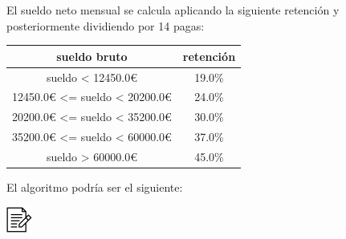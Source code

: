\documentclass[
]{book}
\begin{document}
El sueldo neto mensual se calcula aplicando la siguiente retención y posteriormente dividiendo por 14 pagas:

\begin{longtable}[]{@{}cc@{}}
\toprule
sueldo bruto & retención\tabularnewline
\midrule
\endhead
sueldo \textless{} 12450.0€ & 19.0\%\tabularnewline
12450.0€ \textless= sueldo \textless{} 20200.0€ & 24.0\%\tabularnewline
20200.0€ \textless= sueldo \textless{} 35200.0€ & 30.0\%\tabularnewline
35200.0€ \textless= sueldo \textless{} 60000.0€ & 37.0\%\tabularnewline
sueldo \textgreater{} 60000.0€ & 45.0\%\tabularnewline
\bottomrule
\end{longtable}

El algoritmo podría ser el siguiente:

\includegraphics{./img/alg.png}
\end{document}
